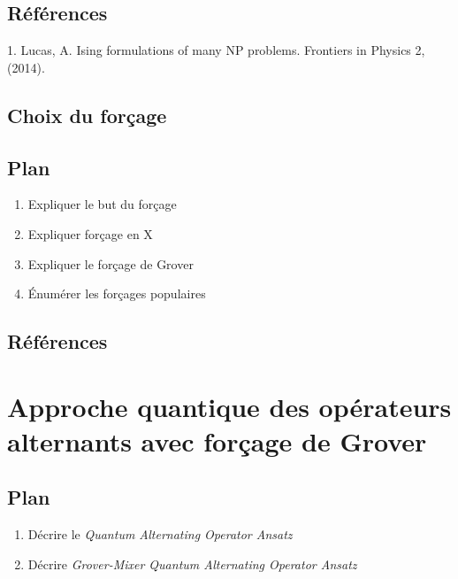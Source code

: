 \subsection*{Références}

1. Lucas, A. Ising formulations of many NP problems. Frontiers in Physics 2, (2014).


\subsection{Choix du forçage}

\subsection*{Plan}

\begin{enumerate}
    \item Expliquer le but du forçage
    \item Expliquer forçage en X
    \item Expliquer le forçage de Grover
    \item Énumérer les forçages populaires
\end{enumerate}

\subsection*{Références}


\section{Approche quantique des opérateurs alternants avec forçage de Grover}

\subsection*{Plan}

\begin{enumerate}
    \item Décrire le \textit{Quantum Alternating Operator Ansatz}
    \item Décrire \textit{Grover-Mixer Quantum Alternating Operator Ansatz}
\end{enumerate}

